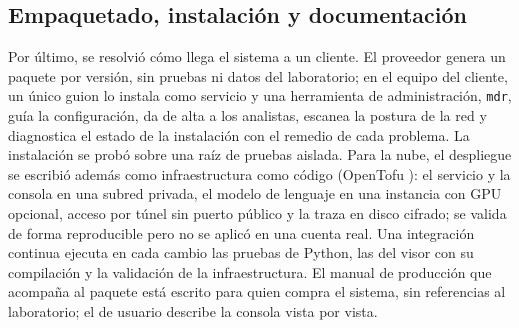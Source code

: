 \subsection{Empaquetado, instalación y documentación}

Por último, se resolvió cómo llega el sistema a un cliente. El proveedor genera un paquete por
versión, sin pruebas ni datos del laboratorio; en el equipo del cliente, un único guion lo instala
como servicio y una herramienta de administración, \texttt{mdr}, guía la configuración, da de alta a
los analistas, escanea la postura de la red y diagnostica el estado de la instalación con el remedio
de cada problema. La instalación se probó sobre una raíz de pruebas aislada. Para la nube, el
despliegue se escribió además como infraestructura como código (OpenTofu \cite{opentofu}): el servicio y la consola
en una subred privada, el modelo de lenguaje en una instancia con GPU opcional, acceso por túnel sin
puerto público y la traza en disco cifrado; se valida de forma reproducible pero no se aplicó en una
cuenta real. Una integración continua ejecuta en cada cambio las pruebas de Python, las del visor
con su compilación y la validación de la infraestructura. El manual de producción que acompaña al
paquete está escrito para quien compra el sistema, sin referencias al laboratorio; el de usuario
describe la consola vista por vista.
